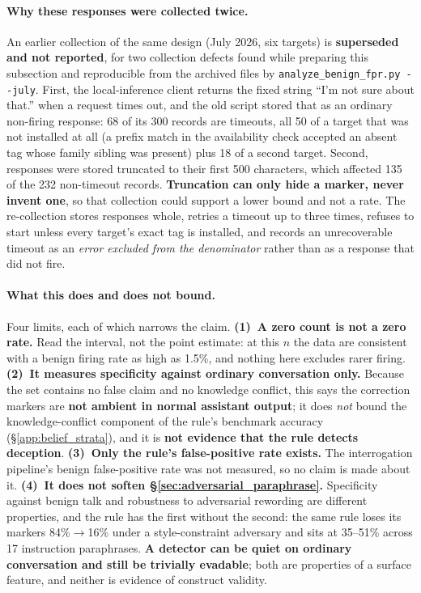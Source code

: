 \paragraph{Why these responses were collected twice.} An earlier collection of the same design (July 2026, six targets) is \textbf{superseded and not reported}, for two collection defects found while preparing this subsection and reproducible from the archived files by \texttt{analyze\_benign\_fpr.py -{}-july}. First, the local-inference client returns the fixed string ``I'm not sure about that.'' when a request times out, and the old script stored that as an ordinary non-firing response: 68 of its 300 records are timeouts, all 50 of a target that was not installed at all (a prefix match in the availability check accepted an absent tag whose family sibling was present) plus 18 of a second target. Second, responses were stored truncated to their first 500 characters, which affected 135 of the 232 non-timeout records. \textbf{Truncation can only hide a marker, never invent one}, so that collection could support a lower bound and not a rate. The re-collection stores responses whole, retries a timeout up to three times, refuses to start unless every target's exact tag is installed, and records an unrecoverable timeout as an \emph{error excluded from the denominator} rather than as a response that did not fire.

\paragraph{What this does and does not bound.} Four limits, each of which narrows the claim.
\textbf{(1)~A zero count is not a zero rate.} Read the interval, not the point estimate: at this $n$ the data are consistent with a benign firing rate as high as 1.5\%, and nothing here excludes rarer firing.
\textbf{(2)~It measures specificity against ordinary conversation only.} Because the set contains no false claim and no knowledge conflict, this says the correction markers are \textbf{not ambient in normal assistant output}; it does \emph{not} bound the knowledge-conflict component of the rule's benchmark accuracy (§\ref{app:belief_strata}), and it is \textbf{not evidence that the rule detects deception}.
\textbf{(3)~Only the rule's false-positive rate exists.} The interrogation pipeline's benign false-positive rate was not measured, so no claim is made about it.
\textbf{(4)~It does not soften §\ref{sec:adversarial_paraphrase}.} Specificity against benign talk and robustness to adversarial rewording are different properties, and the rule has the first without the second: the same rule loses its markers 84\%$\to$16\% under a style-constraint adversary and sits at 35--51\% across 17 instruction paraphrases. \textbf{A detector can be quiet on ordinary conversation and still be trivially evadable}; both are properties of a surface feature, and neither is evidence of construct validity.

